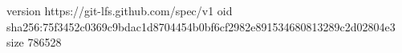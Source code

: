 version https://git-lfs.github.com/spec/v1
oid sha256:75f3452c0369c9bdac1d8704454b0bf6cf2982e891534680813289c2d02804e3
size 786528
